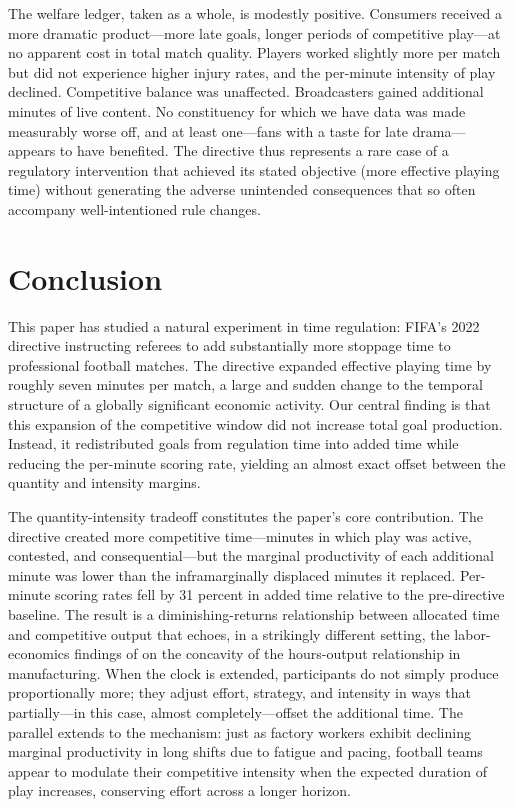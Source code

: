 The welfare ledger, taken as a whole, is modestly positive. Consumers
received a more dramatic product---more late goals, longer periods of
competitive play---at no apparent cost in total match quality. Players
worked slightly more per match but did not experience higher injury
rates, and the per-minute intensity of play declined. Competitive balance
was unaffected. Broadcasters gained additional minutes of live content.
No constituency for which we have data was made measurably worse off, and
at least one---fans with a taste for late drama---appears to have
benefited. The directive thus represents a rare case of a regulatory
intervention that achieved its stated objective (more effective playing
time) without generating the adverse unintended consequences that so often
accompany well-intentioned rule changes.



\section{Conclusion}\label{sec:conclusion}

This paper has studied a natural experiment in time regulation: FIFA's
2022 directive instructing referees to add substantially more stoppage
time to professional football matches. The directive expanded effective
playing time by roughly seven minutes per match, a large and sudden
change to the temporal structure of a globally significant economic
activity. Our central finding is that this expansion of the competitive
window did not increase total goal production. Instead, it redistributed
goals from regulation time into added time while reducing the per-minute
scoring rate, yielding an almost exact offset between the quantity and
intensity margins.

The quantity-intensity tradeoff constitutes the paper's core contribution.
The directive created more competitive time---minutes in which play was
active, contested, and consequential---but the marginal productivity of
each additional minute was lower than the inframarginally displaced
minutes it replaced. Per-minute scoring rates fell by 31 percent in added
time relative to the pre-directive baseline. The result is a
diminishing-returns relationship between allocated time and competitive
output that echoes, in a strikingly different setting, the labor-economics
findings of \citet{Pencavel2015} on the concavity of the hours-output
relationship in manufacturing. When the clock is extended, participants do
not simply produce proportionally more; they adjust effort, strategy, and
intensity in ways that partially---in this case, almost
completely---offset the additional time. The parallel extends to the
mechanism: just as factory workers exhibit declining marginal productivity
in long shifts due to fatigue and pacing, football teams appear to
modulate their competitive intensity when the expected duration of play
increases, conserving effort across a longer horizon.

